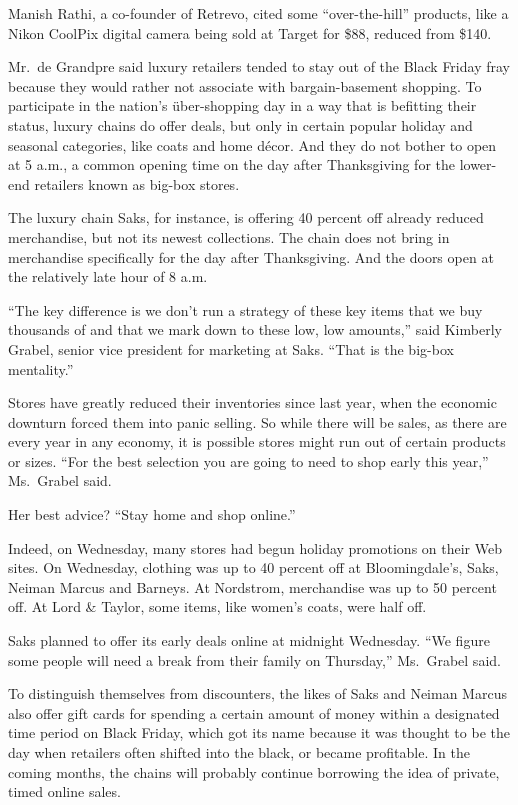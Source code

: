 ﻿\documentclass[12pt]{article}
\begin{document}
Manish Rathi, a co-founder of Retrevo, cited some ``over-the-hill'' products, like a Nikon CoolPix
digital camera being sold at Target for \$88, reduced from \$140.

Mr.~de Grandpre said luxury retailers tended to stay out of the Black Friday fray because they would
rather not associate with bargain-basement shopping. To participate in the nation's über-shopping
day in a way that is befitting their status, luxury chains do offer deals, but only in certain
popular holiday and seasonal categories, like coats and home d\'ecor. And they do not bother to open
at 5 a.m., a common opening time on the day after Thanksgiving for the lower-end retailers known as
big-box stores.

The luxury chain Saks, for instance, is offering 40 percent off already reduced merchandise, but not
its newest collections. The chain does not bring in merchandise specifically for the day after
Thanksgiving. And the doors open at the relatively late hour of 8 a.m.

``The key difference is we don't run a strategy of these key items that we buy thousands of and that
we mark down to these low, low amounts,'' said Kimberly Grabel, senior vice president for marketing
at Saks. ``That is the big-box mentality.''

Stores have greatly reduced their inventories since last year, when the economic downturn forced
them into panic selling. So while there will be sales, as there are every year in any economy, it is
possible stores might run out of certain products or sizes. ``For the best selection you are going
to need to shop early this year,'' Ms.~Grabel said.

Her best advice? ``Stay home and shop online.''

Indeed, on Wednesday, many stores had begun holiday promotions on their Web sites. On Wednesday,
clothing was up to 40 percent off at Bloomingdale's, Saks, Neiman Marcus and Barneys. At Nordstrom,
merchandise was up to 50 percent off. At Lord \& Taylor, some items, like women's coats, were half
off.

Saks planned to offer its early deals online at midnight Wednesday. ``We figure some people will
need a break from their family on Thursday,'' Ms.~Grabel said.

To distinguish themselves from discounters, the likes of Saks and Neiman Marcus also offer gift
cards for spending a certain amount of money within a designated time period on Black Friday, which
got its name because it was thought to be the day when retailers often shifted into the black, or
became profitable. In the coming months, the chains will probably continue borrowing the idea of
private, timed online sales.
\end{document}
